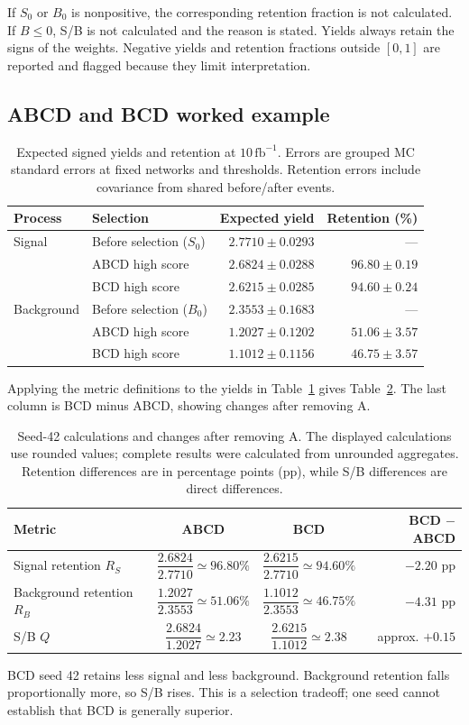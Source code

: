 \documentclass[11pt,a4paper]{article}
\begin{document}
If $S_0$ or $B_0$ is nonpositive, the corresponding retention fraction is not calculated.
If $B\leq0$, S/B is not calculated and the reason is stated.
Yields always retain the signs of the weights. Negative yields and retention fractions outside $[0,1]$ are reported and flagged because they limit interpretation.

\subsection{ABCD and BCD worked example}
\begin{table}[H]
\caption{Expected signed yields and retention at $10\,\mathrm{fb}^{-1}$. Errors are grouped MC standard errors at fixed networks and thresholds. Retention errors include covariance from shared before/after events.}
\label{tab:yields}
\centering
\begin{tabular}{llrr}
\toprule
Process & Selection & Expected yield & Retention (\%) \\
\midrule
Signal & Before selection ($S_0$) & $2.7710\pm0.0293$ & --- \\
 & ABCD high score & $2.6824\pm0.0288$ & $96.80\pm0.19$ \\
 & BCD high score & $2.6215\pm0.0285$ & $94.60\pm0.24$ \\
Background & Before selection ($B_0$) & $2.3553\pm0.1683$ & --- \\
 & ABCD high score & $1.2027\pm0.1202$ & $51.06\pm3.57$ \\
 & BCD high score & $1.1012\pm0.1156$ & $46.75\pm3.57$ \\
\bottomrule
\end{tabular}
\end{table}
Applying the metric definitions to the yields in Table~\ref{tab:yields} gives Table~\ref{tab:worked-metrics}.
The last column is BCD minus ABCD, showing changes after removing A.

\begin{table}[H]
\caption{Seed-42 calculations and changes after removing A. The displayed calculations use rounded values; complete results were calculated from unrounded aggregates. Retention differences are in percentage points (pp), while S/B differences are direct differences.}
\label{tab:worked-metrics}
\centering\small
\renewcommand{\arraystretch}{2.6}
\begin{tabular}{lccr}
\toprule
Metric & ABCD & BCD & BCD $-$ ABCD \\
\midrule
Signal retention $R_S$ & $\dfrac{2.6824}{2.7710}\simeq96.80\%$ & $\dfrac{2.6215}{2.7710}\simeq94.60\%$ & $-2.20$ pp \\
Background retention $R_B$ & $\dfrac{1.2027}{2.3553}\simeq51.06\%$ & $\dfrac{1.1012}{2.3553}\simeq46.75\%$ & $-4.31$ pp \\
S/B $Q$ & $\dfrac{2.6824}{1.2027}\simeq2.23$ & $\dfrac{2.6215}{1.1012}\simeq2.38$ & approx. $+0.15$ \\
\bottomrule
\end{tabular}
\end{table}
BCD seed 42 retains less signal and less background. Background retention falls proportionally more, so S/B rises.
This is a selection tradeoff; one seed cannot establish that BCD is generally superior.
\end{document}
